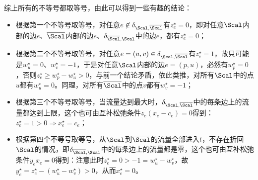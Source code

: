 \documentclass{ctexart}
\begin{document}
综上所有的不等号都取等号，由此可以得到一些有趣的结论：
\begin{itemize}
    \item 根据第一个不等号取等号，对任意$e \not \in \delta_{\Scal, \overline{\Scal}}$有$z_e^\star = 0$，即对任意$\Scal$内部的边$e$、$\overline{\Scal}$内部的边$e$、$\delta_{\overline{\Scal}, \Scal}$中的边$e$，都有$z_e^\star = 0$；
    \item 根据第二个不等号取等号，对任意$e = (u,v) \in \delta_{\Scal, \overline{\Scal}}$有$z_e^\star = 1$，故只可能是$w_u^\star = 0$、$w_v^\star = -1$，于是对任意$\Scal$内部的边$e = (p, u)$，必然有$w_p^\star = 0$，否则$z_e^\star \ge w_p^\star - w_u^\star > 0$，与前一个结论矛盾，依此类推，对所有$\Scal$中的点$u$都有$w_u^\star = 0$。同理，对所有$\overline{\Scal}$中的点$v$都有$w_v^\star = -1$；
    \item 根据第三个不等号取等号，当流量达到最大时，$\delta_{\Scal, \overline{\Scal}}$中的每条边上的流量都达到上限，这个也可由互补松弛条件$z_e (x_e - c_e) = 0$得到：$z_e^\star = 1 > 0 \Longrightarrow x_e^\star = c_e$；
    \item 根据第四个不等号取等号，从$\Scal$到$\overline{\Scal}$的流量全部进入$t$，不存在折回$\Scal$的情况，即$\delta_{\overline{\Scal}, \Scal}$中的每条边上的流量都是零，这个也可由互补松弛条件$y_e x_e = 0$得到：注意此时$z_e^\star = 0 > -1 = w_u^\star - w_v^\star$，故$y_e^\star = z_e^\star - (w_u^\star - w_v^\star) > 0$，从而$x_e^\star = 0$。
\end{itemize}
\end{document}
